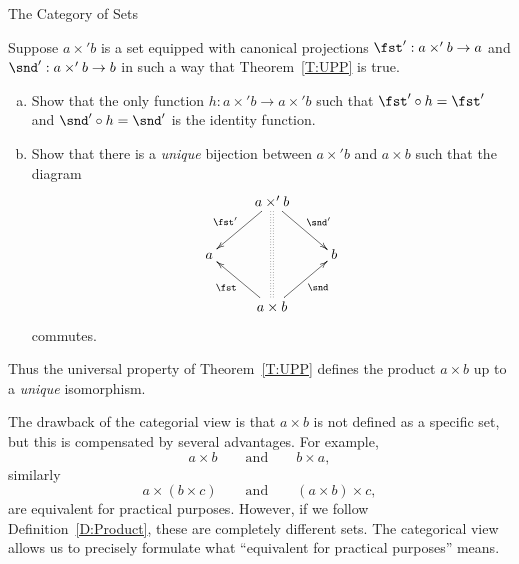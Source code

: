 \begin{unit}{The Category of Sets}
\begin{problem}\label{P:UPP:Uniq}
  Suppose \(a \times' b\) is a set equipped with canonical projections \(\fst':a \times' b \to a\) and \(\snd':a \times' b \to b\) in such a way that Theorem~\ref{T:UPP} is true.
  \begin{enumerate}[(a)]
  \item Show that the only function \(h:a \times' b \to a \times' b\) such that \(\fst' \circ h = \fst'\) and \(\snd' \circ h = \snd'\) is the identity function.
  \item Show that there is a \emph{unique} bijection between \(a \times' b\) and \(a \times b\) such that the diagram \[\xymatrix{
      & a \times' b \ar[dl]_-{\fst'} \ar[dr]^-{\snd'} \ar@{:}[dd] \\
      a & & b \\
      & a \times b \ar[ul]^-{\fst} \ar[ur]_-{\snd}
    }\] commutes.
  \end{enumerate}
\end{problem}

\noindent
Thus the universal property of Theorem~\ref{T:UPP} defines the product \(a \times b\) up to a \emph{unique} isomorphism.

The drawback of the categorial view is that \(a \times b\) is not defined as a specific set, but this is compensated by several advantages.
For example, \[a \times b \qquad\text{and}\qquad b \times a,\] similarly \[a \times (b \times c) \qquad\text{and}\qquad (a \times b) \times c,\] are equivalent for practical purposes.
However, if we follow Definition~\ref{D:Product}, these are completely different sets.
The categorical view allows us to precisely formulate what ``equivalent for practical purposes'' means.


\end{unit}
